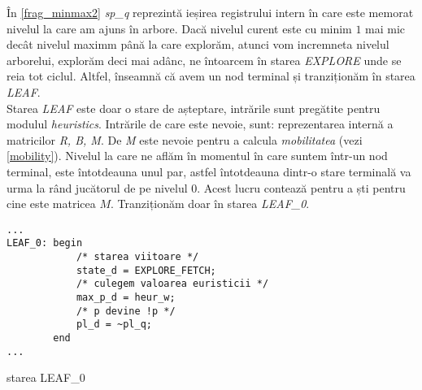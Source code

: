 \documentclass[12pt,twoside,a4paper,fleqn]{book}
\theoremstyle{definition}
\begin{document}
În \ref{frag_minmax2} \emph{sp\_q} reprezintă ieșirea registrului intern în care este memorat nivelul la care am ajuns în arbore. Dacă nivelul curent este cu minim $1$ mai mic decât nivelul maximm până la care explorăm, atunci vom incremneta nivelul arborelui, explorăm deci mai adânc, ne întoarcem în starea \emph{EXPLORE} unde se reia tot ciclul. Altfel, înseamnă că avem un nod terminal și tranziționăm în starea \emph{LEAF}.\\
Starea \emph{LEAF} este doar o stare de așteptare, intrările sunt pregătite pentru modulul \emph{heuristics}. Intrările de care este nevoie, sunt: reprezentarea internă a matricilor \emph{R, B, M}. De \emph{M} este nevoie pentru a calcula \emph{mobilitatea} (vezi \ref{mobility}). Nivelul la care ne aflăm în momentul în care suntem într-un nod terminal, este întotdeauna unul par, astfel întotdeauna dintr-o stare terminală va urma la rând jucătorul de pe nivelul $0$. Acest lucru contează pentru a ști pentru cine este matricea $M$. Tranziționăm doar în starea 
\emph{LEAF\_0}.\\
\begin{fragmentsursa}
\begin{scriptsize}
\begin{verbatim}
...
LEAF_0: begin
            /* starea viitoare */
            state_d = EXPLORE_FETCH;
            /* culegem valoarea euristicii */
            max_p_d = heur_w;
            /* p devine !p */
            pl_d = ~pl_q;				  
        end
...
\end{verbatim}
\end{scriptsize}
\caption{starea LEAF\_0}
\label{frag_minmax3}
\end{fragmentsursa}
				
\end{document}
